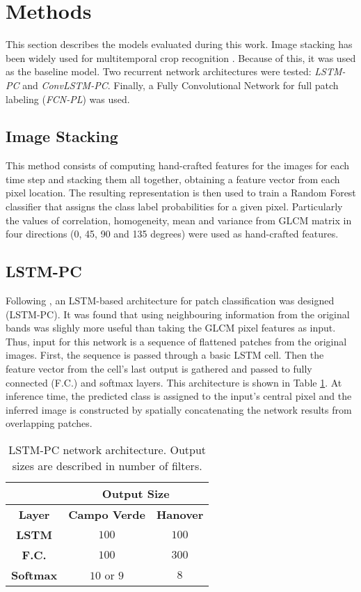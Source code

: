 \section{Methods}

This section describes the models evaluated during this work. Image stacking has been widely used for multitemporal crop recognition \cite{schneider2012monitoring,schneider2008compact}. Because of this, it was used as the baseline model. Two recurrent network architectures were tested: \textit{LSTM-PC} and \textit{ConvLSTM-PC}. Finally, a Fully Convolutional Network for full patch labeling (\textit{FCN-PL}) was used.

\subsection{Image Stacking}

This method consists of computing hand-crafted features for the images for each time step and stacking them all together, obtaining a feature vector from each pixel location. The resulting representation is then used to train a Random Forest classifier that assigns the class label probabilities for a given pixel. Particularly the values of correlation, homogeneity, mean and variance from GLCM matrix in four directions (0, 45, 90 and 135 degrees) were used as hand-crafted features. 
\subsection{LSTM-PC}

Following \cite{rnnjose}, an LSTM-based architecture for patch classification was designed (LSTM-PC). It was found that using neighbouring information from the original bands was slighly more useful than taking the GLCM pixel features as input. Thus, input for this network is a sequence of flattened patches from the original images. First, the sequence is passed through a basic LSTM cell. Then the feature vector from the cell's last output is gathered and passed to fully connected (F.C.) and softmax layers. This architecture is shown in Table \ref{table:lstm}. At inference time, the predicted class is assigned to the input's central pixel and the inferred image is constructed by spatially concatenating the network results from overlapping patches. \vspace{0.5cm}

\begin{table}[h!]
\centering
\caption{LSTM-PC network architecture. Output sizes are described in number of filters.}
\label{table:lstm}
\begin{tabular}{|c|c|c|}
\hline
\multicolumn{1}{|l|}{} & \multicolumn{2}{c|}{\textbf{Output Size}} \\ \hline
\textbf{Layer} & \textbf{Campo Verde} & \textbf{Hanover} \\ \hline
\textbf{LSTM} & $100$ & $100$ \\ \hline
\textbf{F.C.} & $100$ & $300$ \\ \hline
\textbf{Softmax} & $10$ or $9$ & $8$ \\ \hline
\end{tabular}
\end{table}

